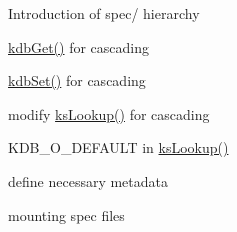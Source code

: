 \begin{DoxyEnumerate}
\item Introduction of spec/ hierarchy
\item \mbox{\hyperlink{group__kdb_ga28e385fd9cb7ccfe0b2f1ed2f62453a1}{kdb\+Get()}} for cascading
\item \mbox{\hyperlink{group__kdb_ga11436b058408f83d303ca5e996832bcf}{kdb\+Set()}} for cascading
\item modify \mbox{\hyperlink{group__keyset_gaa34fc43a081e6b01e4120daa6c112004}{ks\+Lookup()}} for cascading
\item K\+D\+B\+\_\+\+O\+\_\+\+D\+E\+F\+A\+U\+LT in \mbox{\hyperlink{group__keyset_gaa34fc43a081e6b01e4120daa6c112004}{ks\+Lookup()}}
\item define necessary metadata
\item mounting spec files
\end{DoxyEnumerate}